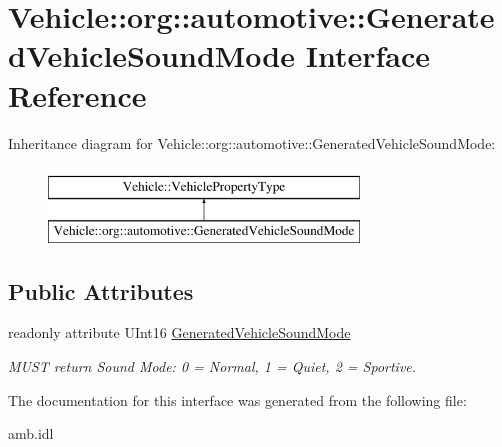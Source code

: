 \hypertarget{interfaceVehicle_1_1org_1_1automotive_1_1GeneratedVehicleSoundMode}{\section{Vehicle\-:\-:org\-:\-:automotive\-:\-:Generated\-Vehicle\-Sound\-Mode Interface Reference}
\label{interfaceVehicle_1_1org_1_1automotive_1_1GeneratedVehicleSoundMode}
}
Inheritance diagram for Vehicle\-:\-:org\-:\-:automotive\-:\-:Generated\-Vehicle\-Sound\-Mode\-:\begin{figure}[H]
\begin{center}
\leavevmode
\includegraphics[height=2.000000cm]{interfaceVehicle_1_1org_1_1automotive_1_1GeneratedVehicleSoundMode}
\end{center}
\end{figure}
\subsection*{Public Attributes}
\begin{DoxyCompactItemize}
\item 
\hypertarget{interfaceVehicle_1_1org_1_1automotive_1_1GeneratedVehicleSoundMode_ad1e146a4304b47113186f2de9efdf99b}{readonly attribute U\-Int16 \hyperlink{interfaceVehicle_1_1org_1_1automotive_1_1GeneratedVehicleSoundMode_ad1e146a4304b47113186f2de9efdf99b}{Generated\-Vehicle\-Sound\-Mode}}\label{interfaceVehicle_1_1org_1_1automotive_1_1GeneratedVehicleSoundMode_ad1e146a4304b47113186f2de9efdf99b}

\begin{DoxyCompactList}\small\item\em M\-U\-S\-T return Sound Mode\-: 0 = Normal, 1 = Quiet, 2 = Sportive. \end{DoxyCompactList}\end{DoxyCompactItemize}


The documentation for this interface was generated from the following file\-:\begin{DoxyCompactItemize}
\item 
amb.\-idl\end{DoxyCompactItemize}
